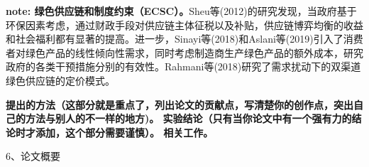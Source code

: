 \documentclass{article}
\begin{document}
\par \textbf{note: 绿色供应链和制度约束（ECSC）\cite{2005Beamon}。}Sheu等(2012)\cite{2012Sheu}的研究发现，当政府基于环保因素考虑，通过财政手段对供应链主体征税以及补贴，供应链博弈均衡的收益和社会福利都有显著的提高。进一步，Sinayi等(2018)\cite{2018Sinayi}和Aslani等(2019)\cite{2019Aslani}引入了消费者对绿色产品的线性倾向性需求，同时考虑制造商生产绿色产品的额外成本，研究政府的各类干预措施分别的有效性。Rahmani等(2018)\cite{2018Rahami}研究了需求扰动下的双渠道绿色供应链的定价模式。
\par \textbf{
    提出的方法（这部分就是重点了，列出论文的贡献点，写清楚你的创作点，突出自己的方法与别人的不一样的地方)。
    实验结论（只有当你论文中有一个强有力的结论时才添加，这个部分需要谨慎）。
    相关工作。
}
\par 6、论文概要
\end{document}

